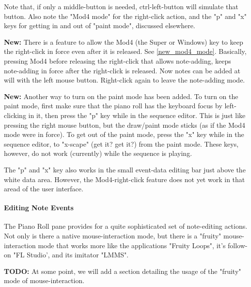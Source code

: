    Note that, if only a middle-button is needed, ctrl-left-button will simulate
   that button.  Also note the "Mod4 mode" for the right-click action, and the
   "p" and "x" keys for getting in and out of "paint mode", discussed
   elsewhere.

   \textbf{New:}
   There is a feature to allow the Mod4 (the Super or Windows) key to keep the
   right-click in force even after it is released.  See \ref{new_mod4_mode}.
   Basically, pressing Mod4 before releasing the right-click that allows
   note-adding, keeps note-adding in force after the right-click is released.
   Now notes can be added at will with the left mouse button.  Right-click
   again to leave the note-adding mode.

   \textbf{New:}
   Another way to turn on the paint mode has been added.
   To turn on the paint mode, first make sure that the piano roll has the
   keyboard focus by left-clicking in it, then press the
   "p" key while in the sequence editor.
   This is just like pressing the right mouse button, but the draw/paint mode
   sticks (as if the Mod4 mode were in force).
   To get out of the paint mode, press the
   "x" key while in the sequence editor, to "x-scape" (get it?  get it?)
   from the paint mode.
   These keys, however, do not work (currently) while the sequence is playing.

   The "p" and "x" key also works in the small event-data editing bar just
   above the white data area.  However, the Mod4-right-click feature does not
   yet work in that aread of the user interface.

\paragraph{Editing Note Events}
\label{paragraph:seq64_pattern_editor_note_events}

   The Piano Roll pane provides for a quite sophisticated set of note-editing
   actions.  Not only is there a native mouse-interaction mode, but there is
   a "fruity" mouse-interaction mode that works more like the applications
   "Fruity Loops", it's follow-on "FL Studio', and its imitator "LMMS".

   \setcounter{ItemCounter}{0}      %

   \textbf{TODO:}
   At some point, we will add a section detailing the usage of the "fruity"
   mode of mouse-interaction.

